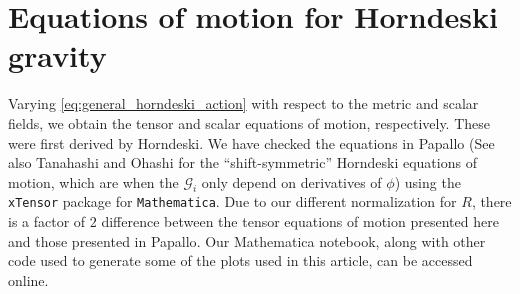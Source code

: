 \documentclass{ws-ijmpd}
\begin{document}
\section{Equations of motion for Horndeski gravity
   \label{sec:eom_horndeski_gravity}
}
Varying \eqref{eq:general_horndeski_action} 
with respect to the metric and scalar fields, 
we obtain the tensor and scalar equations of motion,
respectively. These were first derived by Horndeski\cite{horndeski_paper}.
We have checked the equations in Papallo\cite{Papallo:2017ddx}
(See also Tanahashi and Ohashi\cite{Tanahashi:2017kgn}
for the ``shift-symmetric'' Horndeski equations of motion, which are
when the $\mathcal{G}_i$ only depend on derivatives of $\phi$)
using the \texttt{xTensor}\cite{xAct,martin2008xperm,Brizuela:2008ra} 
package for \texttt{Mathematica}.
Due to our different normalization for $R$, there is a
factor of $2$ difference between the tensor equations of motion
presented here and those presented in Papallo\cite{Papallo:2017ddx}.
Our Mathematica notebook, along with other code used to generate
some of the plots used in this article,
can be accessed online\cite{github_article}.
\end{document}
